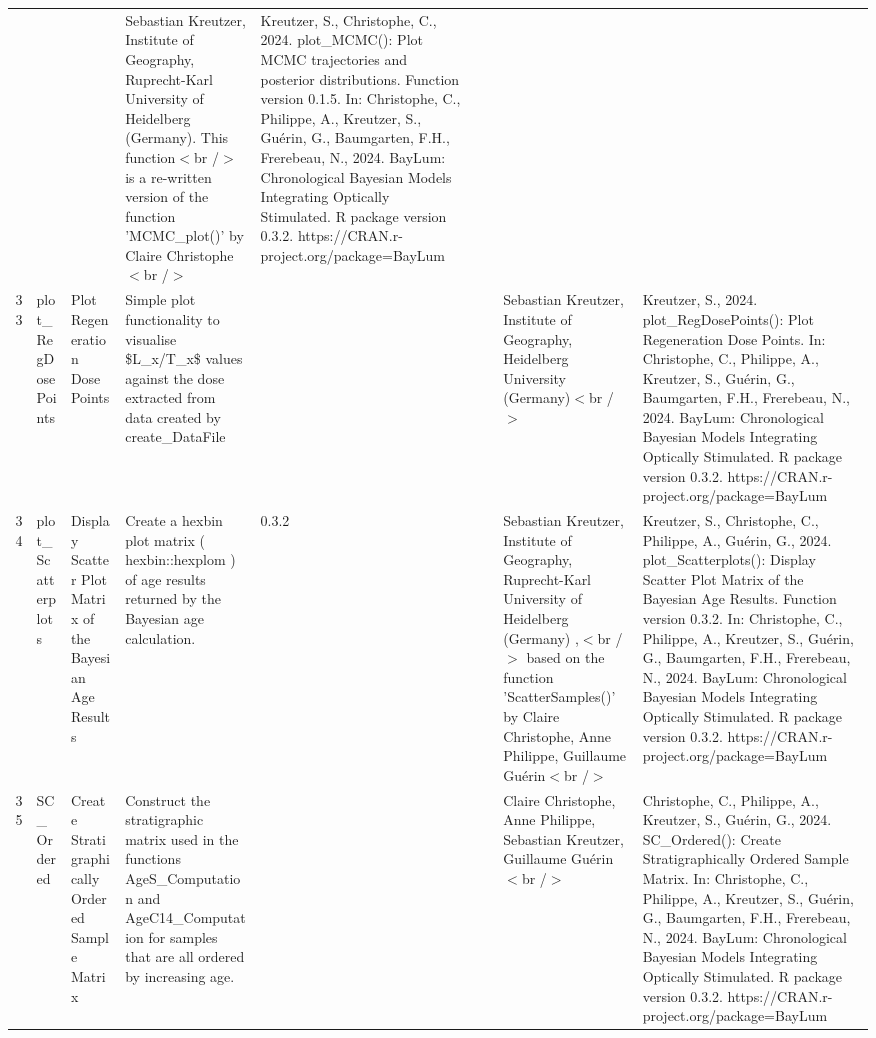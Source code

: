 \begin{table}[ht]
\begin{tabular}{rllllllll}
 &  &  & Sebastian Kreutzer, Institute of Geography, Ruprecht-Karl University of Heidelberg (Germany). This function$<$br /$>$ is a re-written version of the function 'MCMC\_plot()' by Claire Christophe$<$br /$>$ & Kreutzer, S., Christophe, C., 2024. plot\_MCMC(): Plot MCMC trajectories and posterior distributions. Function version 0.1.5. In: Christophe, C., Philippe, A., Kreutzer, S., Guérin, G., Baumgarten, F.H., Frerebeau, N., 2024. BayLum: Chronological Bayesian Models Integrating Optically Stimulated. R package version 0.3.2. https://CRAN.r-project.org/package=BayLum
 \\ 
  33 & plot\_RegDosePoints & Plot Regeneration Dose Points & Simple plot functionality to visualise \$L\_x/T\_x\$ values against the dose extracted from data created by  create\_DataFile &  &  &  & Sebastian Kreutzer, Institute of Geography, Heidelberg University (Germany)$<$br /$>$ & Kreutzer, S., 2024. plot\_RegDosePoints(): Plot Regeneration Dose Points. In: Christophe, C., Philippe, A., Kreutzer, S., Guérin, G., Baumgarten, F.H., Frerebeau, N., 2024. BayLum: Chronological Bayesian Models Integrating Optically Stimulated. R package version 0.3.2. https://CRAN.r-project.org/package=BayLum
 \\ 
  34 & plot\_Scatterplots & Display Scatter Plot Matrix of the Bayesian Age Results & Create a hexbin plot matrix ( hexbin::hexplom ) of age results returned by the Bayesian age calculation. & 0.3.2
 &  &  & Sebastian Kreutzer, Institute of Geography, Ruprecht-Karl University of Heidelberg (Germany) ,$<$br /$>$ based on the function 'ScatterSamples()' by Claire Christophe, Anne Philippe, Guillaume Guérin$<$br /$>$ & Kreutzer, S., Christophe, C., Philippe, A., Guérin, G., 2024. plot\_Scatterplots(): Display Scatter Plot Matrix of the Bayesian Age Results. Function version 0.3.2. In: Christophe, C., Philippe, A., Kreutzer, S., Guérin, G., Baumgarten, F.H., Frerebeau, N., 2024. BayLum: Chronological Bayesian Models Integrating Optically Stimulated. R package version 0.3.2. https://CRAN.r-project.org/package=BayLum
 \\ 
  35 & SC\_Ordered & Create Stratigraphically Ordered Sample Matrix & Construct the stratigraphic matrix used in the functions  AgeS\_Computation  and  AgeC14\_Computation  for samples that are all ordered by increasing age. &  &  &  & Claire Christophe, Anne Philippe, Sebastian Kreutzer, Guillaume Guérin$<$br /$>$ & Christophe, C., Philippe, A., Kreutzer, S., Guérin, G., 2024. SC\_Ordered(): Create Stratigraphically Ordered Sample Matrix. In: Christophe, C., Philippe, A., Kreutzer, S., Guérin, G., Baumgarten, F.H., Frerebeau, N., 2024. BayLum: Chronological Bayesian Models Integrating Optically Stimulated. R package version 0.3.2. https://CRAN.r-project.org/package=BayLum

\end{tabular}
\end{table}
